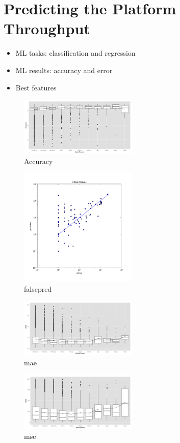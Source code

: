 \section{Predicting the Platform Throughput}\label{sec:Throughput}
\begin{itemize}

	\item ML tasks: classification and regression

	\item ML results: accuracy and error

	\item Best features

\end{itemize}


\begin{figure}[htbp]
	\centering
		\includegraphics[width=0.5\textwidth]{accuracy.png}
	\caption{Accuracy}
	\label{fig:accuracy}
\end{figure}

\begin{figure}[htbp]
	\centering
		\includegraphics[width=0.5\textwidth]{falsepred.png}
	\caption{falsepred}
	\label{fig:falsepred}
\end{figure}


\begin{figure}[htbp]
	\centering
		\includegraphics[width=0.5\textwidth]{mae.png}
	\caption{mae}
	\label{fig:mae}
\end{figure}


\begin{figure}[htbp]
	\centering
		\includegraphics[width=0.5\textwidth]{mse.png}
	\caption{mse}
	\label{fig:mse}
\end{figure}